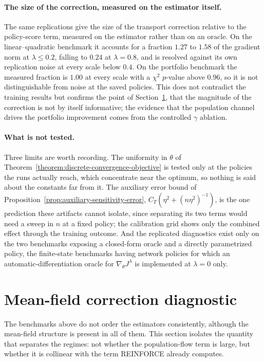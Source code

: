 \paragraph{The size of the correction, measured on the estimator itself.}
The same replications give the size of the transport correction relative to the policy-score term, measured on the estimator rather than on an oracle. On the linear--quadratic benchmark it accounts for a fraction $1.27$ to $1.58$ of the gradient norm at $\lambda\leq0.2$, falling to $0.24$ at $\lambda=0.8$, and is resolved against its own replication noise at every scale below $0.4$. On the portfolio benchmark the measured fraction is $1.00$ at every scale with a $\chi^2$ $p$-value above $0.96$, so it is not distinguishable from noise at the saved policies. This does not contradict the training results but confirms the point of Section~\ref{sec:correction-alignment}, that the magnitude of the correction is not by itself informative; the evidence that the population channel drives the portfolio improvement comes from the controlled $\gamma$ ablation.

\paragraph{What is not tested.}
Three limits are worth recording. The uniformity in $\theta$ of Theorem~\ref{theorem:discrete-convergence-objective} is tested only at the policies the runs actually reach, which concentrate near the optimum, so nothing is said about the constants far from it. The auxiliary error bound of Proposition~\ref{prop:auxiliary-sensitivity-error}, $C_T(\eta^2+(n\eta^2)^{-1})$, is the one prediction these artifacts cannot isolate, since separating its two terms would need a sweep in $n$ at a fixed policy; the calibration grid shows only the combined effect through the training outcome. And the replicated diagnostics exist only on the two benchmarks exposing a closed-form oracle and a directly parametrized policy, the finite-state benchmarks having network policies for which an automatic-differentiation oracle for $\nabla_\theta J^\lambda$ is implemented at $\lambda=0$ only.

\section{Mean-field correction diagnostic}
\label{sec:correction-alignment}

The benchmarks above do not order the estimators consistently, although the mean-field structure is present in all of them. This section isolates the quantity that separates the regimes: not whether the population-flow term is large, but whether it is collinear with the term REINFORCE already computes.

